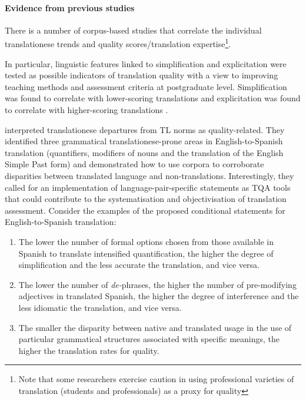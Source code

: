 \paragraph{Evidence from previous studies} There is a number of corpus-based studies that correlate the individual translationese trends and quality scores/translation expertise\footnote{Note that some researchers exercise caution in using professional varieties of translation (students and professionals) as a proxy for quality}.

In particular, linguistic features linked to simplification and explicitation were tested as possible indicators of translation quality with a view to improving teaching methods and assessment criteria at postgraduate level. Simplification was found to correlate with lower-scoring translations and explicitation was found to correlate with higher-scoring translations \cite{Scarpa2006}. 

\citet{Rabadan2009} interpreted translationese departures from TL norms as quality-related. They identified three grammatical translationese-prone areas in English-to-Spanish translation (quantifiers, modifiers of nouns and the translation of the English Simple Past form) and demonstrated how to use corpora to corroborate disparities between translated language and non-translations. %
Interestingly, they called for an implementation of language-pair-specific statements as \gls{TQA} tools that could contribute to the systematisation and objectivisation of translation assessment. Consider the examples of the proposed conditional statements for English-to-Spanish translation:

\begin{enumerate}\compresslist{}
	\item The lower the number of formal options chosen from those available in Spanish to translate intensified quantification, the higher the degree of simplification and the less accurate the translation, and vice versa.
	\item The lower the number of \textit{de-}phrases, the higher the number of pre-modifying adjectives in translated Spanish, the higher the degree of interference and the less idiomatic the translation, and vice versa.
	\item The smaller the disparity between native and translated usage in the use of particular grammatical structures associated with specific meanings, the higher the translation rates for quality.
\end{enumerate}

